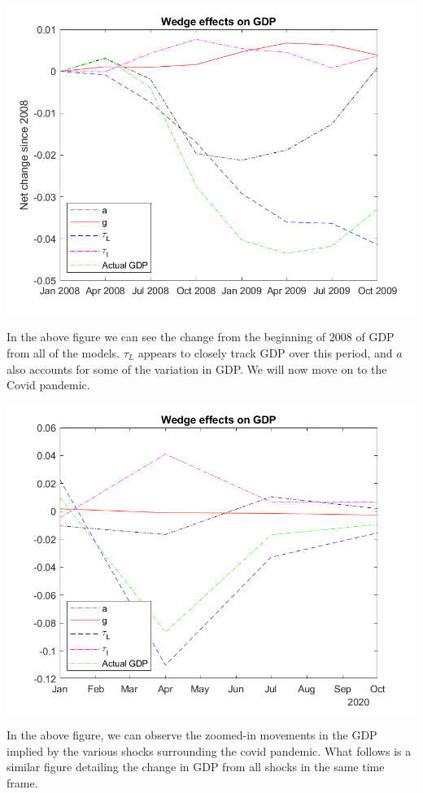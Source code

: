 \documentclass[11pt]{article} %
\begin{document}
\includegraphics{wedgesfindiff}

In the above figure we can see the change from the beginning of 2008 of GDP from all of the models. $\tau_L$ appears to closely track GDP over this period, and $a$ also accounts for some of the variation in GDP. We will now move on to the Covid pandemic.

\includegraphics{wedgescov}

In the above figure, we can observe the zoomed-in movements in the GDP implied by the various shocks surrounding the covid pandemic. What follows is a similar figure detailing the change in GDP from all shocks in the same time frame.
\end{document}
